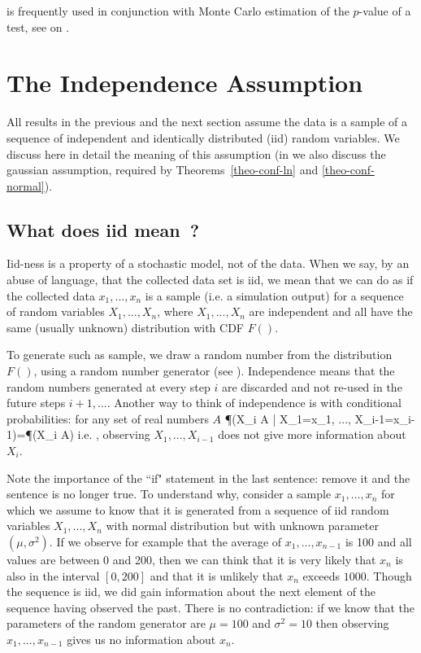  is frequently used in conjunction with
Monte Carlo estimation of the $p$-value of a test, see
 on .
%
%
\section{The Independence Assumption}
All results in the previous and the next
section assume the data is a sample of a sequence of
independent and identically distributed (iid) random variables.
We discuss here in detail the meaning of this assumption (in
 we also discuss the gaussian
assumption, required by Theorems~\ref{theo-conf-ln} and
\ref{theo-conf-normal}).

\subsection{What does iid mean~?}

Iid-ness is a property of a stochastic model, not of the data.
When we say, by an abuse of language, that the collected data
set is iid, we mean that we can do as if the collected data
$x_1, ..., x_n$ is a sample (i.e. a simulation output) for a
sequence of random variables $X_1, ..., X_n$, where $X_1,
...,X_n$ are independent and all have the same (usually
unknown) distribution with CDF $F()$.

To generate such as sample, we draw a random
number from the distribution $F()$, using a
random number generator (see ).
Independence means that the random numbers
generated at every step $i$ are discarded and not
re-used in the future steps $i+1, ...$. Another
way to think of independence is with conditional
probabilities: for any set of real numbers $A$
 \be
 \P(X_i \in A \;|\; X_1=x_1, ..., X_{i-1}=x_{i-1})=\P(X_i \in A)
 \ee
i.e. , observing
$X_1,...,X_{i-1}$ does not give more information about $X_i$.

Note the importance of the ``if" statement in the last
sentence: remove it and the sentence is no longer true. To
understand why, consider a sample $x_1,...,x_n$ for which we
assume to know that it is generated from a sequence of iid
random variables $X_1, ...,X_n$ with normal distribution but
with unknown parameter $(\mu, \sigma^2)$. If we observe for
example that the average of $x_1, ...,x_{n-1}$ is 100 and all
values are between 0 and 200, then we can think that it is very
likely that $x_n$ is also in the interval $[0, 200]$ and that
it is unlikely that $x_n$ exceeds $1000$. Though the sequence
is iid, we did gain information about the next element of the
sequence having observed the past. There is no contradiction:
if we know that the parameters of the random generator are
$\mu=100$ and $\sigma^2=10$ then observing $x_1,...,x_{n-1}$
gives us no information about $x_n$.


